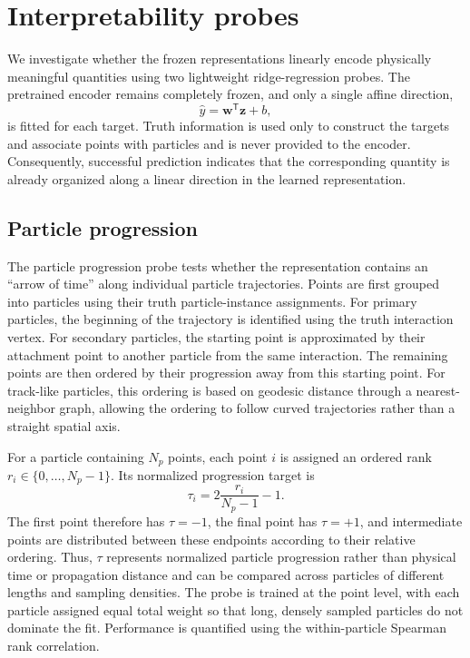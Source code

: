 \section{Interpretability probes}

  We investigate whether the frozen representations linearly encode physically meaningful quantities using two lightweight ridge-regression probes. The
  pretrained encoder remains completely frozen, and only a single affine direction,
  \begin{equation}
      \hat{y} = \mathbf{w}^{\mathsf T}\mathbf{z} + b,
  \end{equation}
  is fitted for each target. Truth information is used only to construct the targets and associate points with particles and is never provided to the
  encoder. Consequently, successful prediction indicates that the corresponding quantity is already organized along a linear direction in the learned
  representation.

\subsection{Particle progression}
\label{sec:time}

  The particle progression probe tests whether the representation contains an ``arrow of time'' along individual particle trajectories. Points are first
  grouped into particles using their truth particle-instance assignments. For primary particles, the beginning of the trajectory is identified using the
  truth interaction vertex. For secondary particles, the starting point is approximated by their attachment point to another particle from the same
  interaction. The remaining points are then ordered by their progression away from this starting point. For track-like particles, this ordering is based on
  geodesic distance through a nearest-neighbor graph, allowing the ordering to follow curved trajectories rather than a straight spatial axis.

  For a particle containing \(N_p\) points, each point \(i\) is assigned an ordered rank \(r_i\in\{0,\ldots,N_p-1\}\). Its normalized progression target is
  \begin{equation}
      \tau_i = 2\frac{r_i}{N_p-1}-1.
  \end{equation}
  The first point therefore has \(\tau=-1\), the final point has \(\tau=+1\), and intermediate points are distributed between these endpoints according to their
  relative ordering. Thus, \(\tau\) represents normalized particle progression rather than physical time or propagation distance and can be compared across
  particles of different lengths and sampling densities. The probe is trained at the point level, with each particle assigned equal total weight so that
  long, densely sampled particles do not dominate the fit. Performance is quantified using the within-particle Spearman rank correlation.

